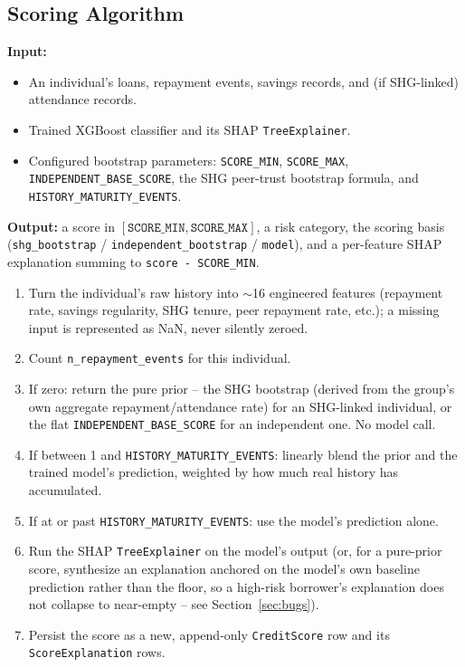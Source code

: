 \documentclass[11pt,a4paper]{article}
\begin{document}
\subsection{Scoring Algorithm}
\textbf{Input:}
\begin{itemize}[leftmargin=0.7cm]
    \item An individual's loans, repayment events, savings records,
    and (if SHG-linked) attendance records.
    \item Trained XGBoost classifier and its SHAP
    \texttt{TreeExplainer}.
    \item Configured bootstrap parameters: \texttt{SCORE\_MIN},
    \texttt{SCORE\_MAX}, \texttt{INDEPENDENT\_BASE\_SCORE}, the SHG
    peer-trust bootstrap formula, and \texttt{HISTORY\_MATURITY\_EVENTS}.
\end{itemize}
\textbf{Output:} a score in $[\texttt{SCORE\_MIN}, \texttt{SCORE\_MAX}]$,
a risk category, the scoring basis (\texttt{shg\_bootstrap} /
\texttt{independent\_bootstrap} / \texttt{model}), and a per-feature
SHAP explanation summing to \texttt{score - SCORE\_MIN}.
\begin{enumerate}[leftmargin=0.7cm]
    \item Turn the individual's raw history into $\sim$16 engineered
    features (repayment rate, savings regularity, SHG tenure, peer
    repayment rate, etc.); a missing input is represented as NaN, never
    silently zeroed.
    \item Count \texttt{n\_repayment\_events} for this individual.
    \item If zero: return the pure prior -- the SHG bootstrap (derived
    from the group's own aggregate repayment/attendance rate) for an
    SHG-linked individual, or the flat \texttt{INDEPENDENT\_BASE\_SCORE}
    for an independent one. No model call.
    \item If between 1 and \texttt{HISTORY\_MATURITY\_EVENTS}: linearly
    blend the prior and the trained model's prediction, weighted by how
    much real history has accumulated.
    \item If at or past \texttt{HISTORY\_MATURITY\_EVENTS}: use the
    model's prediction alone.
    \item Run the SHAP \texttt{TreeExplainer} on the model's output
    (or, for a pure-prior score, synthesize an explanation anchored on
    the model's own baseline prediction rather than the floor, so a
    high-risk borrower's explanation does not collapse to
    near-empty -- see Section~\ref{sec:bugs}).
    \item Persist the score as a new, append-only \texttt{CreditScore}
    row and its \texttt{ScoreExplanation} rows.
\end{enumerate}
\end{document}
